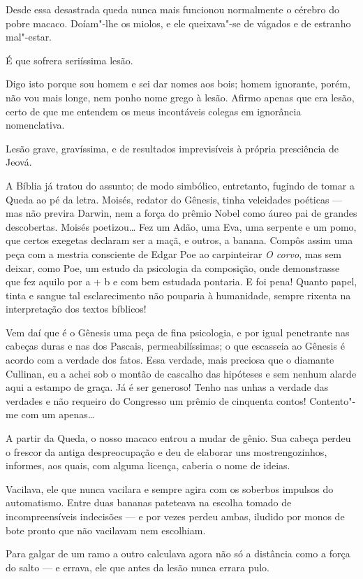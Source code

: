 Desde essa desastrada queda nunca mais funcionou normalmente o cérebro
do pobre macaco. Doíam"-lhe os miolos, e ele queixava"-se de vágados e de
estranho mal"-estar.

É que sofrera seriíssima lesão.

Digo isto porque sou homem e sei dar nomes aos bois; homem ignorante,
porém, não vou mais longe, nem ponho nome grego à lesão. Afirmo apenas
que era lesão, certo de que me entendem os meus incontáveis colegas em
ignorância nomenclativa.

Lesão grave, gravíssima, e de resultados imprevisíveis à própria
presciência de Jeová.

A Bíblia já tratou do assunto; de modo simbólico, entretanto, fugindo de
tomar a Queda ao pé da letra. Moisés, redator do Gênesis, tinha
veleidades poéticas --- mas não previra Darwin, nem a força do prêmio
Nobel como áureo pai de grandes descobertas. Moisés poetizou\ldots{} Fez um
Adão, uma Eva, uma serpente e um pomo, que certos exegetas declaram ser
a maçã, e outros, a banana. Compôs assim uma peça com a mestria
consciente de Edgar Poe ao carpinteirar \emph{O corvo}, mas sem deixar,
como Poe, um estudo da psicologia da composição, onde demonstrasse que
fez aquilo por a + b e com bem estudada pontaria. E foi pena! Quanto
papel, tinta e sangue tal esclarecimento não pouparia à humanidade,
sempre rixenta na interpretação dos textos bíblicos!

Vem daí que é o Gênesis uma peça de fina psicologia, e por igual
penetrante nas cabeças duras e nas dos Pascais, permeabilíssimas; o que
escasseia ao Gênesis é acordo com a verdade dos fatos. Essa verdade,
mais preciosa que o diamante Cullinan, eu a achei sob o montão de
cascalho das hipóteses e sem nenhum alarde aqui a estampo de graça. Já é
ser generoso! Tenho nas unhas a verdade das verdades e não requeiro do
Congresso um prêmio de cinquenta contos! Contento"-me com um apenas\ldots{}

A partir da Queda, o nosso macaco entrou a mudar de gênio. Sua cabeça
perdeu o frescor da antiga despreocupação e deu de elaborar uns
mostrengozinhos, informes, aos quais, com alguma licença, caberia o nome
de ideias.

Vacilava, ele que nunca vacilara e sempre agira com os soberbos impulsos
do automatismo. Entre duas bananas pateteava na escolha tomado de
incompreensíveis indecisões --- e por vezes perdeu ambas, iludido por
monos de bote pronto que não vacilavam nem escolhiam.

Para galgar de um ramo a outro calculava agora não só a distância como a
força do salto --- e errava, ele que antes da lesão nunca errara pulo.

